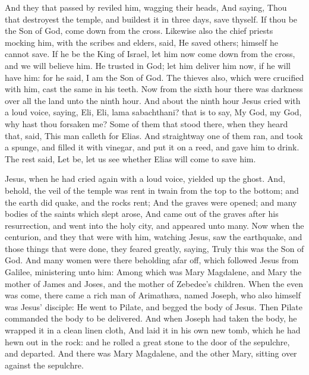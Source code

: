  And they that passed by reviled him, wagging their
heads,  And saying, Thou that destroyest the temple, and
buildest it in three days, save thyself. If thou be the Son of God, come
down from the cross.  Likewise also the chief priests
mocking him, with the scribes and elders, said,  He saved
others; himself he cannot save. If he be the King of Israel, let him now
come down from the cross, and we will believe him.  He
trusted in God; let him deliver him now, if he will have him: for he
said, I am the Son of God.  The thieves also, which were
crucified with him, cast the same in his teeth.  Now from
the sixth hour there was darkness over all the land unto the ninth hour.
 And about the ninth hour Jesus cried with a loud voice,
saying, Eli, Eli, lama sabachthani? that is to say, My God, my God, why
hast thou forsaken me?  Some of them that stood there, when
they heard that, said, This man calleth for Elias.  And
straightway one of them ran, and took a spunge, and filled it with
vinegar, and put it on a reed, and gave him to drink.  The
rest said, Let be, let us see whether Elias will come to save him.

 Jesus, when he had cried again with a loud voice,
yielded up the ghost.  And, behold, the veil of the temple
was rent in twain from the top to the bottom; and the earth did quake,
and the rocks rent;  And the graves were opened; and many
bodies of the saints which slept arose,  And came out of
the graves after his resurrection, and went into the holy city, and
appeared unto many.  Now when the centurion, and they that
were with him, watching Jesus, saw the earthquake, and those things that
were done, they feared greatly, saying, Truly this was the Son of God.
 And many women were there beholding afar off, which
followed Jesus from Galilee, ministering unto him:  Among
which was Mary Magdalene, and Mary the mother of James and Joses, and
the mother of Zebedee's children.  When the even was come,
there came a rich man of Arimathæa, named Joseph, who also himself was
Jesus' disciple:  He went to Pilate, and begged the body of
Jesus. Then Pilate commanded the body to be delivered.  And
when Joseph had taken the body, he wrapped it in a clean linen cloth,
 And laid it in his own new tomb, which he had hewn out in
the rock: and he rolled a great stone to the door of the sepulchre, and
departed.  And there was Mary Magdalene, and the other
Mary, sitting over against the sepulchre.

